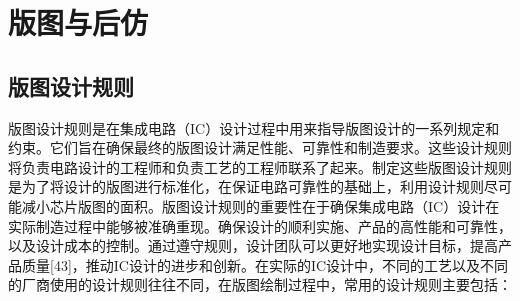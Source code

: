 \chapter{版图与后仿}

\section{版图设计规则}

版图设计规则是在集成电路（IC）设计过程中用来指导版图设计的一系列规定和约束。它们旨在确保最终的版图设计满足性能、可靠性和制造要求。这些设计规则将负责电路设计的工程师和负责工艺的工程师联系了起来。制定这些版图设计规则是为了将设计的版图进行标准化，在保证电路可靠性的基础上，利用设计规则尽可能减小芯片版图的面积。版图设计规则的重要性在于确保集成电路（IC）设计在实际制造过程中能够被准确重现。确保设计的顺利实施、产品的高性能和可靠性，以及设计成本的控制。通过遵守规则，设计团队可以更好地实现设计目标，提高产品质量[43]，推动IC设计的进步和创新。在实际的IC设计中，不同的工艺以及不同的厂商使用的设计规则往往不同，在版图绘制过程中，常用的设计规则主要包括：

